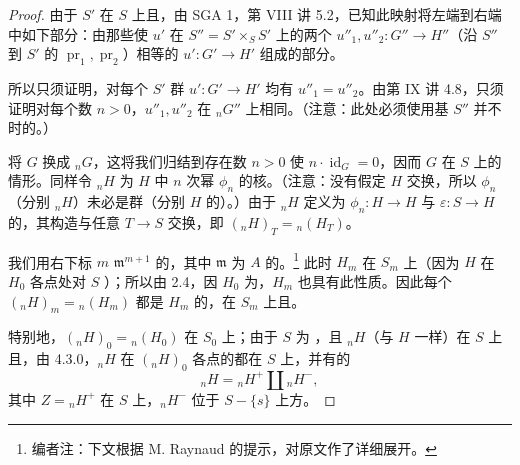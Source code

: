 \begin{proof}
由于 $S'$ 在 $S$ 上且，由 SGA 1，第 VIII 讲 5.2，已知此映射将左端到右端中如下部分：由那些使 $u'$ 在 $S''=S'\times_S S'$ 上的两个 $u''_1,u''_2:G''\to H''$（沿 $S''$ 到 $S'$ 的 $\operatorname{pr}_1,\operatorname{pr}_2$）相等的 $u':G'\to H'$ 组成的部分。

所以只须证明，对每个 $S'$ 群 $u':G'\to H'$ 均有 $u''_1=u''_2$。由第 IX 讲 4.8，只须证明对每个数 $n>0$，$u''_1,u''_2$ 在 ${}_nG''$ 上相同。（注意：此处必须使用基 $S''$ 并不时的。）

将 $G$ 换成 ${}_nG$，这将我们归结到存在数 $n>0$ 使 $n\cdot\operatorname{id}_G=0$，因而 $G$ 在 $S$ 上的情形。同样令 ${}_nH$ 为 $H$ 中 $n$ 次幂 $\phi_n$ 的核。（注意：没有假定 $H$ 交换，所以 $\phi_n$（分别 ${}_nH$）未必是群（分别 $H$ 的）。）由于 ${}_nH$ 定义为 $\phi_n:H\to H$ 与 $\varepsilon:S\to H$ 的，其构造与任意 $T\to S$ 交换，即 $({}_nH)_T={}_n(H_T)$。

我们用右下标 $m$  $\mathfrak m^{m+1}$ 的，其中 $\mathfrak m$ 为 $A$ 的。\footnote[25]{编者注：下文根据 M. Raynaud 的提示，对原文作了详细展开。} 此时 $H_m$ 在 $S_m$ 上（因为 $H$ 在 $H_0$ 各点处对 $S$ ）；所以由 2.4，因 $H_0$ 为，$H_m$ 也具有此性质。因此每个 $({}_nH)_m={}_n(H_m)$ 都是 $H_m$ 的，在 $S_m$ 上且。

特别地，$({}_nH)_0={}_n(H_0)$ 在 $S_0$ 上；由于 $S$ 为 ，且 ${}_nH$（与 $H$ 一样）在 $S$ 上且，由 4.3.0，${}_nH$ 在 $({}_nH)_0$ 各点的都在 $S$ 上，并有的
\[
{}_nH={}_nH^+\coprod{}_nH^-,\tag{*}
\]
其中 $Z={}_nH^+$ 在 $S$ 上，${}_nH^-$ 位于 $S-\{s\}$ 上方。


\end{proof}
